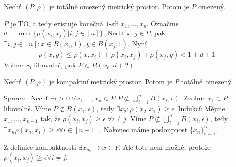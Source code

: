 \documentclass[12pt]{article}					%
\begin{document}
		\begin{veta}
			Nechť $(P, \rho)$ je totálně omezený metrický prostor. Potom je $P$ omezený.

			\begin{dukazin}
				$P$ je TO, a tedy existuje konečná $1$-síť $x_1, …, x_n$. Označme $d = \max\{\rho(x_i, x_j) | i, j \in [n]\}$. Nechť $x, y \in P$, pak $\exists i, j \in [n]: x \in B(x_i, 1), y \in B(x_j, 1)$. Nyní
				$$ \rho(x, y) ≤ \rho(x, x_i) + \rho(x_i, x_j) + \rho(x_j, y) < 1 + d + 1. $$
				Volme $x_0$ libovolně, pak $P \subset B(x_0, d + 2)$.
			\end{dukazin}
		\end{veta}


		\begin{veta}
			Nechť $(P, \rho)$ je kompaktní metrický prostor. Potom je $P$ totálně omezený.

			\begin{dukazin}
				Sporem: Nechť $\exists \epsilon > 0\ \forall x_1, …, x_n \in P: P \not\subset \bigcup_{i=1}^n B(x_i, \epsilon)$. Zvolme $x_1 \in P$ libovolně. Víme $P \not\subset B(x_1, \epsilon)$, tedy $\exists x_2: \rho(x_2, x_1) ≥ \epsilon$. Indukcí: Mějme $x_1, …, x_{n-1}$ tak, že $\rho(x_i, x_j) ≥ \epsilon\ \forall i ≠ j$. Víme $P \not\subset \bigcup_{i=1}^n B(x_i, \epsilon)$, tedy $\exists x_n \rho(x_n, x_i) ≥ \epsilon \forall i \in [n-1]$. Nakonec máme posloupnost $\{x_n\}_{n=1}^∞$.

				Z definice kompaktnosti $\exists x_{n_k} \rightarrow x \in P$. Ale toto není možné, protože $\rho(x_i, x_j) ≥ \epsilon \forall i ≠ j$.
			\end{dukazin}
		\end{veta}
		
\end{document}
